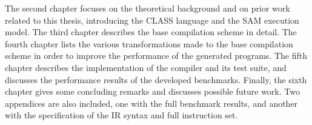 The second chapter focuses on the theoretical background and on prior work related to this thesis, introducing the \ac{CLASS} language and the \ac{SAM} execution model. The third chapter describes the base compilation scheme in detail. The fourth chapter lists the various transformations made to the base compilation scheme in order to improve the performance of the generated programs. The fifth chapter describes the implementation of the compiler and its test suite, and discusses the performance results of the developed benchmarks. Finally, the sixth chapter gives some concluding remarks and discusses possible future work. Two appendices are also included, one with the full benchmark results, and another with the specification of the \ac{IR} syntax and full instruction set.
